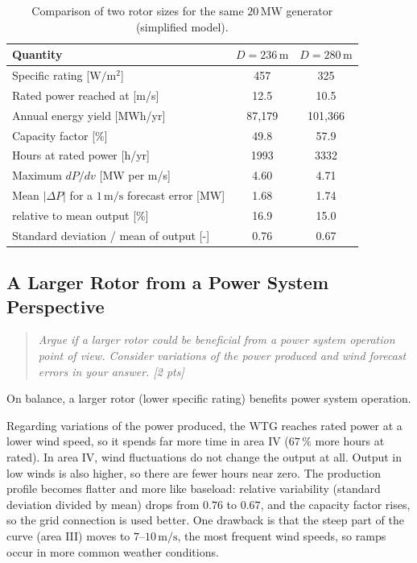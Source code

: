 \begin{table}[H]
    \centering
    \caption{Comparison of two rotor sizes for the same $20\,\mathrm{MW}$ generator (simplified model).}
    \label{tab:elec-rotor}
    \begin{tabular}{lcc}
        \hline
        Quantity & $D=236\,\mathrm{m}$ & $D=280\,\mathrm{m}$ \\
        \hline
        Specific rating [$\mathrm{W/m^2}$] & 457 & 325 \\
        Rated power reached at [m/s] & 12.5 & 10.5 \\
        Annual energy yield [MWh/yr] & 87,179 & 101,366 \\
        Capacity factor [\%] & 49.8 & 57.9 \\
        Hours at rated power [h/yr] & 1993 & 3332 \\
        Maximum $dP/dv$ [MW per m/s] & 4.60 & 4.71 \\
        Mean $|\Delta P|$ for a $1\,\mathrm{m/s}$ forecast error [MW] & 1.68 & 1.74 \\
        \quad relative to mean output [\%] & 16.9 & 15.0 \\
        Standard deviation / mean of output [-] & 0.76 & 0.67 \\
        \hline
    \end{tabular}
\end{table}

\subsection{A Larger Rotor from a Power System Perspective}
\label{sec:elec-rotor-system}
\begin{quote}
\emph{Argue if a larger rotor could be beneficial from a power system operation point of view. Consider variations of the power produced and wind forecast errors in your answer. [2 pts]}
\end{quote}

On balance, a larger rotor (lower specific rating) benefits power system operation.

Regarding variations of the power produced, the WTG reaches rated power at a lower wind speed, so it spends far more time in area IV ($67\,\%$ more hours at rated). In area IV, wind fluctuations do not change the output at all. Output in low winds is also higher, so there are fewer hours near zero. The production profile becomes flatter and more like baseload: relative variability (standard deviation divided by mean) drops from $0.76$ to $0.67$, and the capacity factor rises, so the grid connection is used better. One drawback is that the steep part of the curve (area III) moves to $7$--$10\,\mathrm{m/s}$, the most frequent wind speeds, so ramps occur in more common weather conditions.

